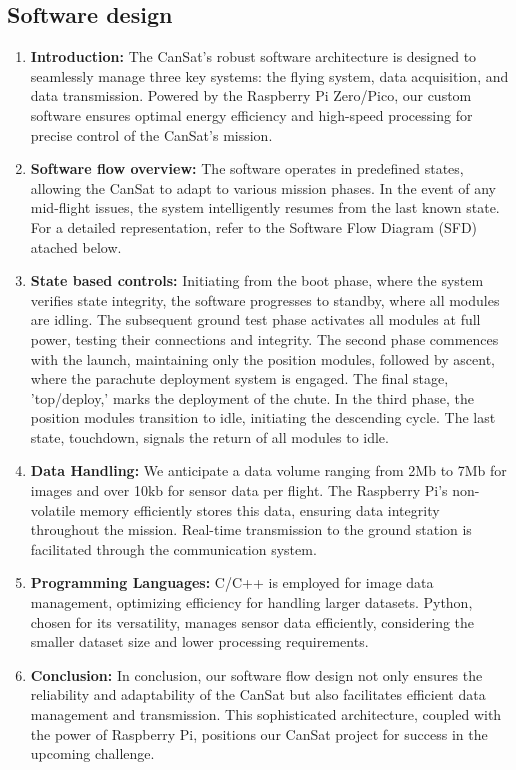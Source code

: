 \documentclass[11pt]{article}
\begin{document}
\subsection{Software design}
\begin{enumerate}
\item \textbf{Introduction:} {The CanSat's robust software architecture is designed to seamlessly manage three key systems: the flying system, data acquisition, and data transmission. Powered by the Raspberry Pi Zero/Pico, our custom software ensures optimal energy efficiency and high-speed processing for precise control of the CanSat's mission.}
\item \textbf{Software flow overview:} {The software operates in predefined states, allowing the CanSat to adapt to various mission phases. In the event of any mid-flight issues, the system intelligently resumes from the last known state. For a detailed representation, refer to the Software Flow Diagram (SFD) atached below.}
\item \textbf{State based controls:} {Initiating from the boot phase, where the system verifies state integrity, the software progresses to standby, where all modules are idling. The subsequent ground test phase activates all modules at full power, testing their connections and integrity. The second phase commences with the launch, maintaining only the position modules, followed by ascent, where the parachute deployment system is engaged. The final stage, 'top/deploy,' marks the deployment of the chute. In the third phase, the position modules transition to idle, initiating the descending cycle. The last state, touchdown, signals the return of all modules to idle.}
\item \textbf{Data Handling:} {We anticipate a data volume ranging from 2Mb to 7Mb for images and over 10kb for sensor data per flight. The Raspberry Pi's non-volatile memory efficiently stores this data, ensuring data integrity throughout the mission. Real-time transmission to the ground station is facilitated through the communication system.}
\item \textbf{Programming Languages:} {C/C++ is employed for image data management, optimizing efficiency for handling larger datasets. Python, chosen for its versatility, manages sensor data efficiently, considering the smaller dataset size and lower processing requirements.}
\item \textbf{Conclusion:} {In conclusion, our software flow design not only ensures the reliability and adaptability of the CanSat but also facilitates efficient data management and transmission. This sophisticated architecture, coupled with the power of Raspberry Pi, positions our CanSat project for success in the upcoming challenge.}

\end{enumerate}
\end{document}
